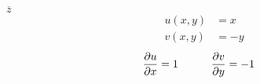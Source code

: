 \item[3.] $\overline{z}$
\begin{align*}
    u(x,y) &= x\\
    v(x,y) &= -y
\end{align*}
\begin{align*}
    \frac{\partial u}{\partial x}  &= 1  &\qquad \frac{\partial v}{\partial y}  &= -1
\end{align*}

